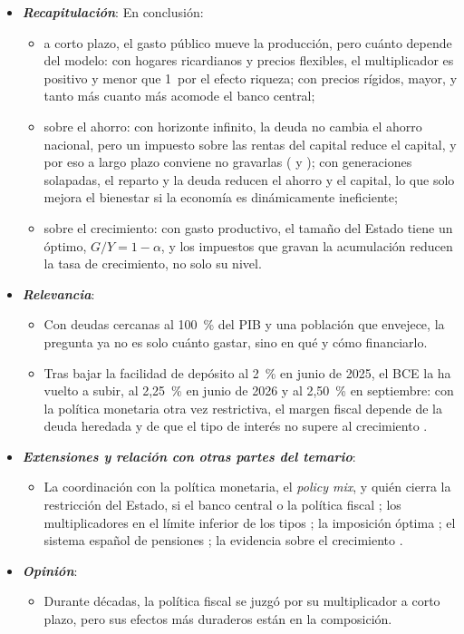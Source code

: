 \documentclass[11pt]{article}
\begin{document}
\begin{itemize}
\item \textbf{\emph{Recapitulación}}: En conclusión:
  \begin{itemize}
  \item a corto plazo, el gasto público mueve la producción, pero cuánto depende del modelo: con hogares ricardianos y precios flexibles, el multiplicador es positivo y menor que 1~por el efecto riqueza; con precios rígidos, mayor, y tanto más cuanto más acomode el banco central;
  \item sobre el ahorro: con horizonte infinito, la deuda no cambia el ahorro nacional, pero un impuesto sobre las rentas del capital reduce el capital, y por eso a largo plazo conviene no gravarlas ( y ); con generaciones solapadas, el reparto y la deuda reducen el ahorro y el capital, lo que solo mejora el bienestar si la economía es dinámicamente ineficiente;
  \item sobre el crecimiento: con gasto productivo, el tamaño del Estado tiene un óptimo, $G/Y=1-\alpha$, y los impuestos que gravan la acumulación reducen la tasa de crecimiento, no solo su nivel.
  \end{itemize}
\item \textbf{\emph{Relevancia}}:
  \begin{itemize}
  \item Con deudas cercanas al 100~\% del PIB y una población que envejece, la pregunta ya no es solo cuánto gastar, sino en qué y cómo financiarlo.

  \item Tras bajar la facilidad de depósito al 2~\% en junio de 2025, el BCE la ha vuelto a subir, al 2,25~\% en junio de 2026 y al 2,50~\% en septiembre\nocite{BCE2026TiposOficiales,BdE2026SubidaSeptiembre}: con la política monetaria otra vez restrictiva, el margen fiscal depende de la deuda heredada y de que el tipo de interés no supere al crecimiento\nocite{Blanchard2019Deuda} .
  \end{itemize}
\item \textbf{\emph{Extensiones y relación con otras partes del temario}}:
  \begin{itemize}
  \item La coordinación con la política monetaria, el \emph{policy mix}, y quién cierra la restricción del Estado, si el banco central o la política fiscal  ; los multiplicadores en el límite inferior de los tipos ; la imposición óptima ; el sistema español de pensiones ; la evidencia sobre el crecimiento .
  \end{itemize}
\item \textbf{\emph{Opinión}}:
  \begin{itemize}
  \item Durante décadas, la política fiscal se juzgó por su multiplicador a corto plazo, pero sus efectos más duraderos están en la composición.


\end{itemize}
\end{itemize}
\end{document}
